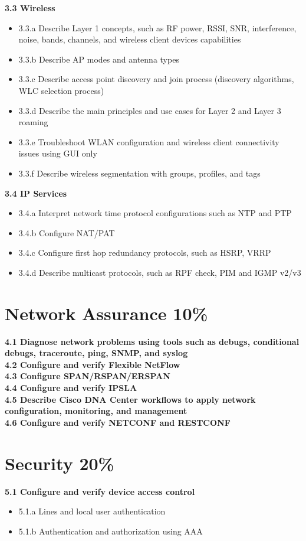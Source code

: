 \documentclass{article}
\begin{document}
\noindent\textbf{3.3 Wireless}
\begin{itemize}
\item 3.3.a Describe Layer 1 concepts, such as RF power, RSSI, SNR, interference, noise, bands, channels, and wireless client devices capabilities
\item 3.3.b Describe AP modes and antenna types
\item 3.3.c Describe access point discovery and join process (discovery algorithms, WLC selection process)
\item 3.3.d Describe the main principles and use cases for Layer 2 and Layer 3 roaming
\item 3.3.e Troubleshoot WLAN configuration and wireless client connectivity issues using GUI only
\item 3.3.f Describe wireless segmentation with groups, profiles, and tags
\end{itemize}


\noindent\textbf{3.4 IP Services}
\begin{itemize}
\item 3.4.a Interpret network time protocol configurations such as NTP and PTP
\item 3.4.b Configure NAT/PAT
\item 3.4.c Configure first hop redundancy protocols, such as HSRP, VRRP
\item 3.4.d Describe multicast protocols, such as RPF check, PIM and IGMP v2/v3
\end{itemize}

\newpage
\section{Network Assurance 10\%}
\noindent\textbf{4.1 Diagnose network problems using tools such as debugs, conditional debugs, traceroute, ping, SNMP, and syslog}\\
\noindent\textbf{4.2 Configure and verify Flexible NetFlow}\\
\noindent\textbf{4.3 Configure SPAN/RSPAN/ERSPAN}\\
\noindent\textbf{4.4 Configure and verify IPSLA}\\
\noindent\textbf{4.5 Describe Cisco DNA Center workflows to apply network configuration, monitoring, and management}\\
\noindent\textbf{4.6 Configure and verify NETCONF and RESTCONF}\\

\newpage
\section{Security 20\%}
\noindent\textbf{5.1 Configure and verify device access control}
\begin{itemize}
\item 5.1.a Lines and local user authentication
\item 5.1.b Authentication and authorization using AAA
\end{itemize}
\end{document}

